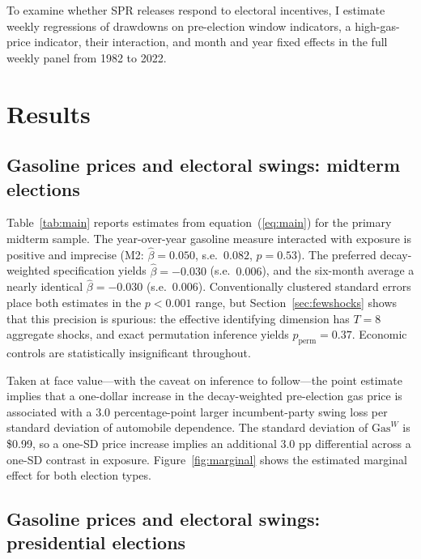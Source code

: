 \documentclass[12pt]{article}
\begin{document}
To examine whether SPR releases respond to electoral incentives, I estimate weekly regressions of drawdowns on pre-election window indicators, a high-gas-price indicator, their interaction, and month and year fixed effects in the full weekly panel from 1982 to 2022.

\section{Results}
\label{sec:results}

\subsection{Gasoline prices and electoral swings: midterm elections}

Table~\ref{tab:main} reports estimates from equation~(\ref{eq:main}) for the primary midterm sample. The year-over-year gasoline measure interacted with exposure is positive and imprecise (M2: $\hat\beta=0.050$, s.e.\ $0.082$, $p=0.53$). The preferred decay-weighted specification yields $\hat\beta=-0.030$ (s.e.\ $0.006$), and the six-month average a nearly identical $\hat\beta=-0.030$ (s.e.\ $0.006$). Conventionally clustered standard errors place both estimates in the $p<0.001$ range, but Section~\ref{sec:fewshocks} shows that this precision is spurious: the effective identifying dimension has $T=8$ aggregate shocks, and exact permutation inference yields $p_{\text{perm}}=0.37$. Economic controls are statistically insignificant throughout.

Taken at face value---with the caveat on inference to follow---the point estimate implies that a one-dollar increase in the decay-weighted pre-election gas price is associated with a 3.0 percentage-point larger incumbent-party swing loss per standard deviation of automobile dependence. The standard deviation of $\mathrm{Gas}^W$ is \$0.99, so a one-SD price increase implies an additional 3.0 pp differential across a one-SD contrast in exposure. Figure~\ref{fig:marginal} shows the estimated marginal effect for both election types.

\subsection{Gasoline prices and electoral swings: presidential elections}
\end{document}
